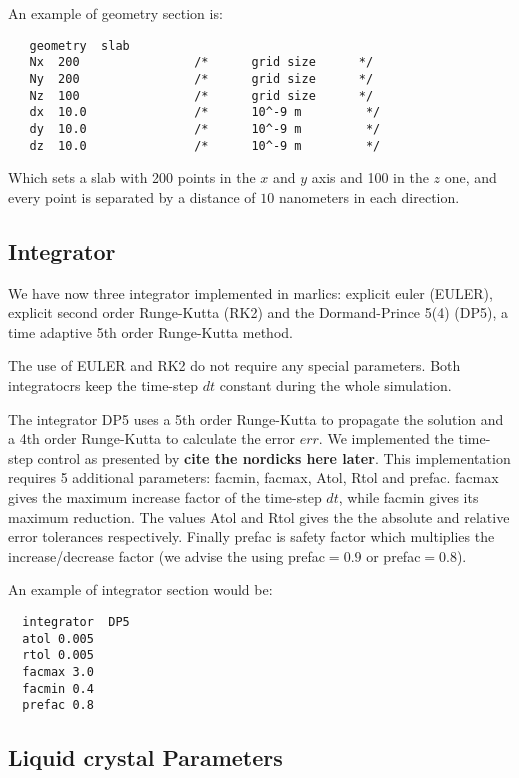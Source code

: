 \documentclass{article}
\begin{document}
An example of geometry section is:

\begin{lstlisting}	
   geometry  slab
   Nx  200                /*      grid size      */
   Ny  200                /*      grid size      */
   Nz  100                /*      grid size      */
   dx  10.0               /*      10^-9 m         */
   dy  10.0               /*      10^-9 m         */
   dz  10.0               /*      10^-9 m         */
\end{lstlisting}

Which sets a slab with 200 points in the $x$ and $y$ axis and 100 in the $z$ one, and every point is separated by a distance of $10$ nanometers in each direction.

\subsection{Integrator}\label{integrator.param}

We have now  three integrator implemented in marlics: explicit euler (EULER), explicit second order Runge-Kutta (RK2) and the Dormand-Prince 5(4) (DP5), a time adaptive 5th order Runge-Kutta method.

The use of EULER and RK2 do not require any special parameters. Both
integratocrs keep the time-step $dt$ constant during the whole
simulation.

The integrator DP5 uses a 5th order Runge-Kutta to propagate the
solution and a 4th order Runge-Kutta to calculate the error $err$. We
implemented the time-step control as presented by \textbf{cite the
  nordicks here later}. This implementation requires 5 additional
parameters: facmin, facmax, Atol, Rtol and prefac. facmax gives the
maximum increase factor of the time-step $dt$, while facmin gives its
maximum reduction. The values Atol and Rtol gives the the absolute and
relative error tolerances respectively. Finally prefac is safety
factor which multiplies the increase/decrease factor (we advise the
using prefac$=0.9$ or prefac$=0.8$).

 An example of integrator section would be:
\begin{lstlisting}
  integrator  DP5
  atol 0.005
  rtol 0.005
  facmax 3.0
  facmin 0.4
  prefac 0.8
\end{lstlisting}

\subsection{Liquid crystal Parameters}\label{lc.param}
\end{document}
